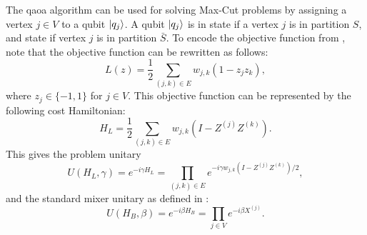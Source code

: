 The \gls{qaoa} algorithm can be used for solving Max-Cut problems by assigning a vertex $j \in V$ to a qubit $\vert{q_j}\rangle$.
A qubit $\vert{q_j}\rangle$ is in state  if a vertex $j$ is in partition $S$, and state  if vertex $j$ is in partition $\bar{S}$.
To encode the objective function from , note that the objective function can be rewritten as follows:
\begin{equation}
L(z) = \frac{1}{2} \sum_{(j, k) \in E} w_{j, k}(1 - z_jz_k),
\end{equation}
where $z_j \in \{-1, 1\}$ for $j \in V$.
This objective function can be represented by the following cost Hamiltonian:
\begin{equation} \label{eqn:problem-hamiltonian}
H_L = \frac{1}{2} \sum_{(j, k) \in E} w_{j, k}(I - Z^{(j)}Z^{(k)}).
\end{equation}
This gives the problem unitary
\begin{equation} \label{eqn:problem-unitary}
U(H_L, \gamma) = e^{-i\gamma H_L} = \prod_{(j, k) \in E} e^{-i\gamma w_{j, k}(I - Z^{(j)}Z^{(k)})/2},
\end{equation}
and the standard mixer unitary as defined in :
\begin{equation} \label{eqn:mixer-unitary}
U(H_B, \beta) = e^{-i\beta H_B} = \prod_{j \in V} e^{-i\beta X^{(j)}}.
\end{equation}

